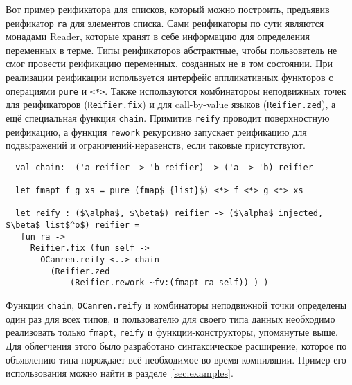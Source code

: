 Вот пример реификатора для списков, который можно построить, предъявив реификатор \lstinline=ra= для элементов списка.
Сами реификаторы по сути являются монадами Reader, которые хранят в себе информацию для определения переменных в терме.
Типы реификаторов абстрактные, чтобы пользователь не смог провести реификацию переменных, созданных не в том состоянии.
При реализации реификации используется интерфейс аппликативных функторов с операциями \lstinline=pure=  и \lstinline=<*>=.
Также используются комбинатороы неподвижных точек для реификаторов (\lstinline=Reifier.fix=) и для call-by-value языков (\lstinline=Reifier.zed=),
а ещё специальная функция \lstinline=chain=. Примитив \lstinline=reify= проводит поверхностную реификацию, а функция \lstinline=rework= рекурсивно запускает реификацию для подвыражений и ограничений-неравенств, если таковые присутствуют.
\begin{lstlisting}
  val chain:  ('a reifier -> 'b reifier) -> ('a -> 'b) reifier

  let fmapt f g xs = pure (fmap$_{list}$) <*> f <*> g <*> xs

  let reify : ($\alpha$, $\beta$) reifier -> ($\alpha$ injected, $\beta$ list$^o$) reifier =
   fun ra ->
     Reifier.fix (fun self ->
       OCanren.reify <..> chain
         (Reifier.zed
             (Reifier.rework ~fv:(fmapt ra self)) ) )
\end{lstlisting}



Функции \lstinline=chain=, \lstinline=OCanren.reify= и комбинаторы неподвижной точки определены один раз для всех типов, и пользователю для своего типа данных необходимо реализовать только \lstinline=fmapt=, \lstinline=reify= и функции-конструкторы, упомянутые выше.
Для облегчения этого было разработано синтаксическое расширение, которое по объявлению типа порождает всё необходимое во время компиляции.
Пример его использования можно найти в разделе~\ref{sec:examples}.

